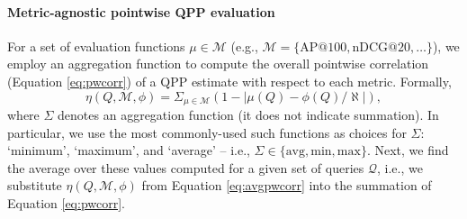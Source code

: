 \paragraph{Metric-agnostic pointwise QPP evaluation}
For a set of evaluation functions
$\mu \in \mathcal{M}$ (e.g., $\mathcal{M} = \{\text{AP@100}, \text{nDCG@20},\ldots\}$), we employ an aggregation function to compute the overall pointwise correlation (Equation \ref{eq:pwcorr}) of a QPP estimate with respect to each metric.
Formally,
\begin{equation}
\eta(Q,\mathcal{M},\phi) = \Sigma_{\mu \in \mathcal{M}} 
(1-|\mu(Q) - \phi(Q)/\aleph|), \label{eq:avgpwcorr}
\end{equation}
where $\Sigma$ denotes an aggregation function (it does not indicate summation). In particular, we use the most commonly-used such functions as choices for $\Sigma$: `minimum', `maximum', and `average' -- i.e., $\Sigma \in \{\text{avg}, \text{min}, \text{max}\}$.
Next, we find the average over these values computed for a given set of queries $\mathcal{Q}$, i.e., we substitute $\eta(Q,\mathcal{M},\phi)$ from Equation \ref{eq:avgpwcorr} into the summation of Equation \ref{eq:pwcorr}.